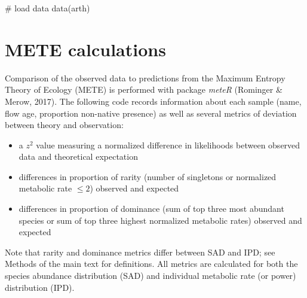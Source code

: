 \documentclass[
  letterpaper,
  DIV=11,
  numbers=noendperiod]{scrartcl}
\newenvironment{Shaded}{\begin{snugshade}}{\end{snugshade}}
\newcommand{\CommentTok}[1]{\textcolor[rgb]{0.37,0.37,0.37}{#1}}
\newcommand{\FunctionTok}[1]{\textcolor[rgb]{0.28,0.35,0.67}{#1}}
\newcommand{\NormalTok}[1]{\textcolor[rgb]{0.00,0.23,0.31}{#1}}
\providecommand{\tightlist}{%
  \setlength{\itemsep}{0pt}\setlength{\parskip}{0pt}}
\begin{document}
\begin{Shaded}
\begin{Highlighting}[]
\CommentTok{\# load data }
\FunctionTok{data}\NormalTok{(arth)}
\end{Highlighting}
\end{Shaded}

\section{METE calculations}\label{mete-calculations}

Comparison of the observed data to predictions from the Maximum Entropy
Theory of Ecology (METE) is performed with package \emph{meteR}
(Rominger \& Merow, 2017). The following code records information about
each sample (name, flow age, proportion non-native presence) as well as
several metrics of deviation between theory and observation:

\begin{itemize}
\tightlist
\item
  a \(z^2\) value measuring a normalized difference in likelihoods
  between observed data and theoretical expectation
\item
  differences in proportion of rarity (number of singletons or
  normalized metabolic rate \(\leq 2\)) observed and expected
\item
  differences in proportion of dominance (sum of top three most abundant
  species or sum of top three highest normalized metabolic rates)
  observed and expected
\end{itemize}

Note that rarity and dominance metrics differ between SAD and IPD; see
Methods of the main text for definitions. All metrics are calculated for
both the species abundance distribution (SAD) and individual metabolic
rate (or power) distribution (IPD).
\end{document}
